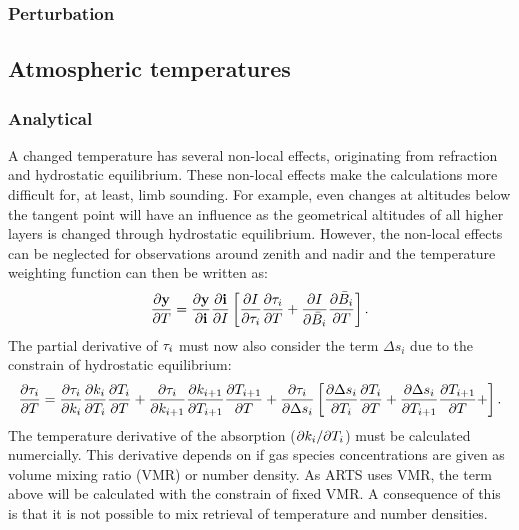 \subsubsection{Perturbation}




\subsection{Atmospheric temperatures}
\label{sec:wfuns:atmtemp}

\subsubsection{Analytical}

A changed temperature has several non-local effects, originating from
refraction and hydrostatic equilibrium. These non-local effects make the
calculations more difficult for, at least, limb sounding. For example, even
changes at altitudes below the tangent point will have an influence as the
geometrical altitudes of all higher layers is changed through hydrostatic
equilibrium. However, the non-local effects can be neglected for observations
around zenith and nadir and the temperature weighting function can
then be written as:
\begin{equation}
  \frac{\partial \mathbf{y}}{\partial T} =  
  \frac{\partial \mathbf{y}}{\partial \mathbf{i}} \frac{\partial \mathbf{i}}{\partial I} 
  \left[
  \frac{\partial I}{\partial \tau_{i}}\frac{\partial \tau_{i}}{\partial T} + 
  \frac{\partial I}{\partial \bar{B}_i}\frac{\partial \bar{B}_i}{\partial T}
  \right].
\end{equation}
The partial derivative of $\tau_{i}$ must now also consider the term $\Delta
s_i$ due to the constrain of hydrostatic equilibrium:
\begin{equation}
  \frac{\partial \tau_{i}}{\partial T} =
  \frac{\partial \tau_{i}}{\partial k_i}\frac{\partial k_i}{\partial T_i} 
  \frac{\partial T_i}{\partial T} +
  \frac{\partial \tau_{i}}{\partial k_{i+1}}\frac{\partial k_{i+1}}{\partial T_{i+1}}
  \frac{\partial T_{i+1}}{\partial T} +
  \frac{\partial \tau_{i}}{\partial \Delta s_i}
  \left[
    \frac{\partial \Delta s_i}{\partial T_i} \frac{\partial T_i}{\partial T} +
    \frac{\partial \Delta s_i}{\partial T_{i+1}} \frac{\partial T_{i+1}}{\partial T} +
  \right].
\end{equation}
The temperature derivative of the absorption ($\partial k_i/\partial T_i$) must be
calculated numercially. This derivative depends on if gas species
concentrations are given as volume mixing ratio (VMR) or number density. As
ARTS uses VMR, the term above will be calculated with the constrain of fixed
VMR. A consequence of this is that it is not possible to mix retrieval of
temperature and number densities.

